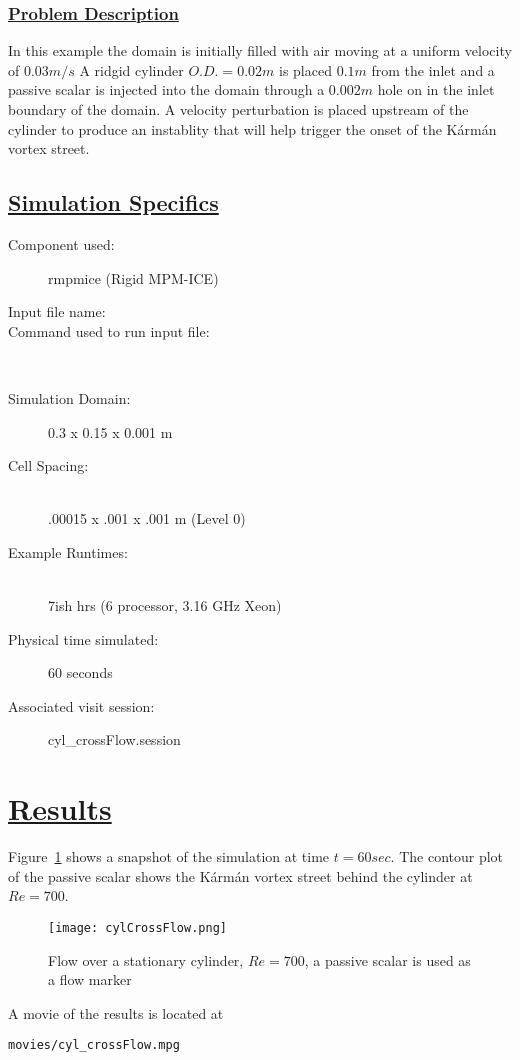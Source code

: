 \subsubsection*{\underline{Problem Description}}
In this example the domain is initially filled with air moving at a uniform velocity of $0.03m/s$  A ridgid cylinder $O.D. = 0.02m$ is placed $0.1m$ from the inlet and a passive scalar is injected into the domain through a $0.002m$ hole on in the inlet boundary of the domain.  A velocity perturbation is placed upstream of the cylinder to produce an instablity that will help trigger the onset of the K\'arm\'an vortex street.
%
\subsection*{\underline{Simulation Specifics}}
\begin{description}
\item [Component used:] \hfill rmpmice (Rigid MPM-ICE)
\item [Input file name:] \hfill {}
\item [Command used to run input file:]\hfill \\

\item [Simulation Domain:]\hfill    0.3 x 0.15 x 0.001 m

\item [Cell Spacing:]\hfill \\
.00015 x .001 x .001 m (Level 0)

\item [Example Runtimes:] \hfill \\
 7ish hrs   (6 processor, 3.16 GHz Xeon)\\

\item [Physical time simulated:] \hfill 60 seconds

\item [Associated visit session:] \hfill cyl\_crossFlow.session

\end{description}

\section*{\underline{Results}}

Figure~\ref{fig:cylCrossFlow} shows a snapshot of the simulation at time $t=60sec$.  The contour
plot of the passive scalar shows the K\'arm\'an vortex street behind the cylinder at $Re=700$.
\begin{figure}
  \center
  \texttt{[image: cylCrossFlow.png]}
  \caption{Flow over a stationary cylinder, $Re=700$, a passive scalar is used as a flow marker}
  \label{fig:cylCrossFlow}
\end{figure}
%
A movie of the results is located at
\begin{Verbatim}[fontsize=\footnotesize]
  movies/cyl_crossFlow.mpg
\end{Verbatim}
\newpage

